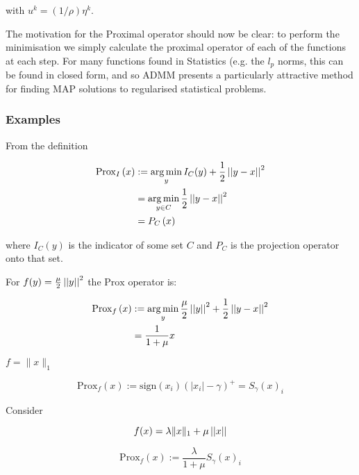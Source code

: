 with \(u^k = \left(1/\rho\right) \eta^k\).

The motivation for the Proximal operator should now be clear: to perform the minimisation we simply calculate the proximal operator of each of the functions at each step. For many functions found in Statistics (e.g. the \(l_p\) norms, this can be found in closed form, and so ADMM presents a particularly attractive method for finding MAP solutions to regularised statistical problems.

\subsubsection{Examples}

\begin{example}[Indicator]
From the definition 

\begin{align}
\mathrm{Prox}_I\left(x\right) &:=  \operatorname*{arg\,min}_y I_C(y) + \frac{1}{2}\left|\left|y-x\right|\right|^2 \\
& = \operatorname*{arg\,min}_{y \in C} \frac{1}{2}\left|\left|y-x\right|\right|^2 \\
& = P_C\left(x\right)
\end{align}

where \(I_C(y)\) is the indicator of some set \(C\) and \(P_C\) is the projection operator onto that set.
\end{example} 

\begin{example}[\(l_2\) norm]
For \(f(y) = \frac{\mu}{2}\left|\left|y\right|\right|^2\) the \(\mathrm{Prox}\) operator is:

\begin{align}
\mathrm{Prox}_f\left(x\right) &:=  \operatorname*{arg\,min}_y \frac{\mu}{2}\left|\left|y\right|\right|^2 + \frac{1}{2}\left|\left|y-x\right|\right|^2 \\
& = \frac{1}{1+\mu}x
\end{align}
\end{example}

\begin{example}[\(l_1\) norm]
\(f = \|x\|_1\)

\begin{equation}
\mathrm{Prox}_f\left(x\right) := \mathrm{sign}(x_i)\left(|x_i| - \gamma\right)^+ = S_\gamma\left(x\right)_i 
\end{equation}
\end{example}

\begin{example}
Consider

\begin{equation}
f(x) = \lambda\|x\|_1 + \mu \left|\left|x\right|\right| 
\end{equation}

\begin{equation}
\mathrm{Prox}_f\left(x\right) := \frac{\lambda}{1+\mu} S_\gamma\left(x\right)_i 
\end{equation}
\end{example}

